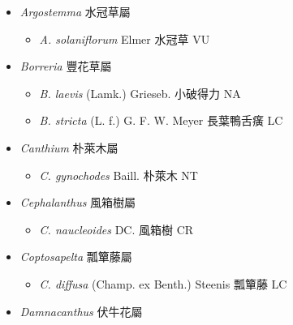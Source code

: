 
  \begin{itemize}
 \item[] \textit{Argostemma} 水冠草屬
                                
  \begin{itemize}
        \item[] \textit{A. solaniflorum} Elmer  水冠草   VU
  \end{itemize}
 \item[] \textit{Borreria} 豐花草屬
                                
  \begin{itemize}
        \item[] \textit{B. laevis} (Lamk.) Grieseb.  小破得力   NA
        \item[] \textit{B. stricta} (L. f.) G. F. W. Meyer  長葉鴨舌癀   LC
  \end{itemize}
 \item[] \textit{Canthium} 朴萊木屬
                                
  \begin{itemize}
        \item[] \textit{C. gynochodes} Baill.  朴萊木   NT
  \end{itemize}
 \item[] \textit{Cephalanthus} 風箱樹屬
                                
  \begin{itemize}
        \item[] \textit{C. naucleoides} DC.  風箱樹   CR
  \end{itemize}
 \item[] \textit{Coptosapelta} 瓢簞藤屬
                                
  \begin{itemize}
        \item[] \textit{C. diffusa} (Champ. ex Benth.) Steenis  瓢簞藤   LC
  \end{itemize}
 \item[] \textit{Damnacanthus} 伏牛花屬
                                

\end{itemize}
